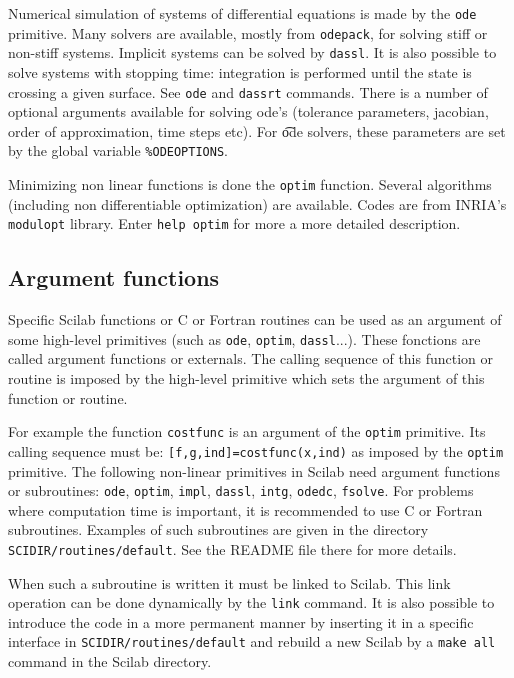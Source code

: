 Numerical simulation of systems of differential equations is
made by the {\tt ode} primitive. Many solvers are available,
mostly from {\tt odepack}, for solving stiff or non-stiff systems.
Implicit systems can be solved by {\tt dassl}. It is also
possible to solve systems with stopping time: integration
is performed until the state is crossing a given surface.
See {\tt ode} and {\tt dassrt} commands. There is a number
of optional arguments available for solving ode's (tolerance
parameters, jacobian, order of approximation, time steps etc).
For {\t ode} solvers, these parameters are set by the global 
variable {\tt \%ODEOPTIONS}.

Minimizing non linear functions is done the {\tt optim} function. 
Several algorithms (including non differentiable optimization)
are available. Codes are from INRIA's {\tt modulopt} library.
Enter {\tt help optim} for more a more detailed description.

\subsection{Argument functions}
\label{refexternals}
Specific Scilab functions or C or Fortran routines can be used as an argument
of some high-level primitives (such as {\tt ode}, {\tt optim}, {\tt dassl}...).
These fonctions are called argument functions or externals.
The calling sequence of this function or routine is imposed by
the high-level primitive which sets the argument of this function or
routine.

For example the function {\tt costfunc} is an argument of 
the {\tt optim} primitive. Its calling sequence must be: 
{\tt [f,g,ind]=costfunc(x,ind)} as imposed by the {\tt optim} primitive.
The following non-linear primitives in Scilab need argument functions
or subroutines: 
{\tt ode}, {\tt optim}, {\tt impl}, {\tt dassl}, {\tt intg}, 
{\tt odedc}, {\tt fsolve}.
For problems where computation time is important, it is recommended
to use C or Fortran subroutines. Examples of such
subroutines are given in the directory {\tt SCIDIR/routines/default}.
See the README file there for more details.

When such a subroutine is written it must be linked to Scilab.
This link operation can be done dynamically by the {\tt link}
command. It is also possible to introduce the code in a more 
permanent manner by inserting it in a specific interface in 
{\tt SCIDIR/routines/default} and rebuild a new Scilab by a 
{\tt make all} command in the Scilab directory.





